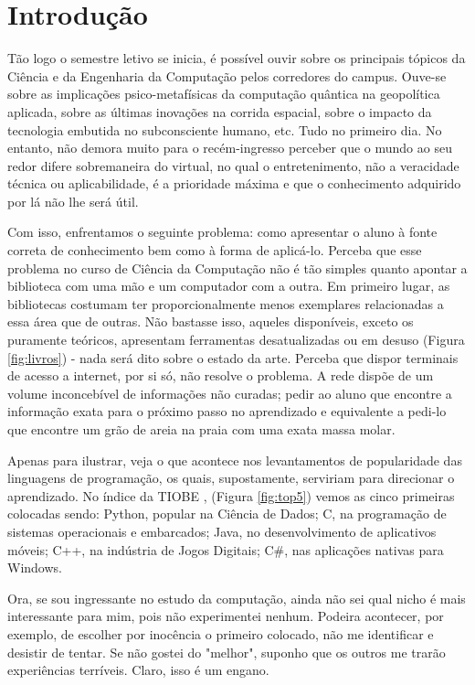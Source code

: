 \documentclass[12pt]{article}
\begin{document}
\section{Introdução}
\begin{multicols}{2}
    Tão logo o semestre letivo se inicia, é possível ouvir sobre os principais tópicos da Ciência e da Engenharia da Computação pelos corredores do campus. Ouve-se sobre as implicações psico-metafísicas da computação quântica na geopolítica aplicada, sobre as últimas inovações na corrida espacial, sobre o impacto da tecnologia embutida no subconsciente humano, etc. Tudo no primeiro dia. No entanto, não demora muito para o recém-ingresso perceber que o mundo ao seu redor difere sobremaneira do virtual, no qual o entretenimento, não a veracidade técnica ou aplicabilidade, é a prioridade máxima e que o conhecimento adquirido por lá não lhe será útil.

    Com isso, enfrentamos o seguinte problema: como apresentar o aluno à fonte correta de conhecimento bem como à forma de aplicá-lo. Perceba que esse problema no curso de Ciência da Computação não é tão simples quanto apontar a biblioteca com uma mão e um computador com a outra. Em primeiro lugar, as bibliotecas costumam ter proporcionalmente menos exemplares relacionadas a essa área que de outras. Não bastasse isso, aqueles disponíveis, exceto os puramente teóricos, apresentam ferramentas desatualizadas ou em desuso (Figura \ref{fig:livros}) - nada será dito sobre o estado da arte. Perceba que dispor terminais de acesso a internet, por si só, não resolve o problema. A rede dispõe de um volume inconcebível de informações não curadas; pedir ao aluno que encontre a informação exata para o próximo passo no aprendizado e equivalente a pedi-lo que encontre um grão de areia na praia com uma exata massa molar.

    Apenas para ilustrar, veja o que acontece nos levantamentos de popularidade das linguagens de programação, os quais, supostamente, serviriam para direcionar o aprendizado. No índice da TIOBE \cite{tiobe-index}, (Figura \ref{fig:top5}) vemos as cinco primeiras colocadas sendo: Python, popular na Ciência de Dados; C, na programação de sistemas operacionais e embarcados; Java, no desenvolvimento de aplicativos móveis; C++, na indústria de Jogos Digitais; C\#, nas aplicações nativas para Windows.

    Ora, se sou ingressante no estudo da computação, ainda não sei qual nicho é mais interessante para mim, pois não experimentei nenhum. Podeira acontecer, por exemplo, de escolher por inocência o primeiro colocado, não me identificar e desistir de tentar. Se não gostei do "melhor", suponho que os outros me trarão experiências terríveis. Claro, isso é um engano.
    

\end{multicols}
\end{document}
